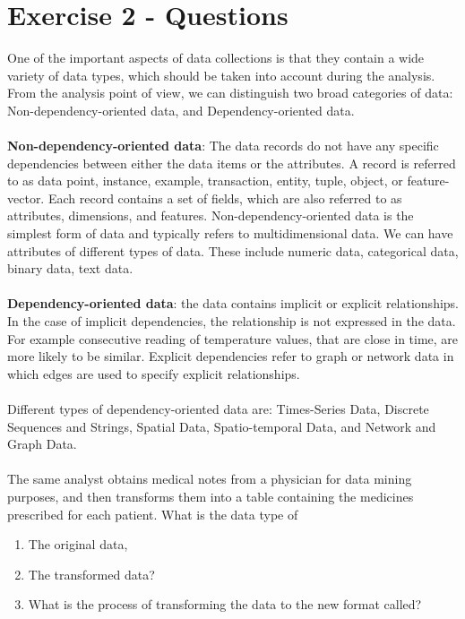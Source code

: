 \documentclass{scrreprt}
\begin{document}
\newpage
\section{Exercise 2 - Questions}\label{E2Q}

One of the important aspects of data collections is that they contain a wide variety of data types, which should be taken into account during the analysis. From the analysis point of view, we can distinguish two broad categories of data: Non-dependency-oriented data, and Dependency-oriented data.
\\
\\
\textbf{Non-dependency-oriented data}: The data records do not have any specific dependencies between either the data items or the attributes. A record is referred to as data point, instance, example, transaction, entity, tuple, object, or feature- vector. Each record contains a set of fields, which are also referred to as attributes, dimensions, and features. Non-dependency-oriented data is the simplest form of data and typically refers to multidimensional data.
We can have attributes of different types of data. These include numeric data, categorical data, binary data, text data.
\\
\\
\textbf{Dependency-oriented data}: the data contains implicit or explicit relationships. In the case of implicit dependencies, the relationship is not expressed in the data. For example consecutive reading of temperature values, that are close in time, are more likely to be similar. Explicit dependencies refer to graph or network data in which edges are used to specify explicit relationships.
\\
\\
Different types of dependency-oriented data are: Times-Series Data, Discrete Sequences and Strings, Spatial Data, Spatio-temporal Data, and Network and Graph Data.
\\
\\
The same analyst obtains medical notes from a physician for data mining purposes, and then transforms them into a table containing the medicines prescribed for each patient. What is the data type of
\begin{enumerate}
\item The original data,
\item The transformed data?
\item What is the process of transforming the data to the new format called?
\end{enumerate}
\end{document}
